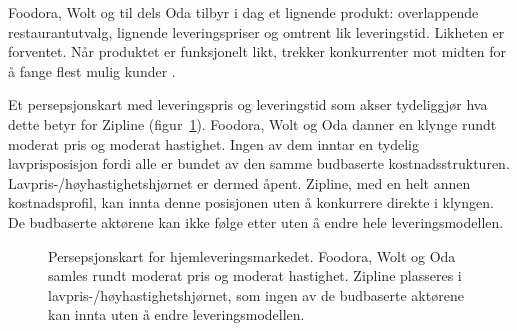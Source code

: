 \documentclass[12pt, a4paper]{article}
\begin{document}
Foodora, Wolt og til dels Oda tilbyr i dag et lignende produkt:
overlappende restaurantutvalg, lignende leveringspriser og omtrent lik
leveringstid. Likheten er forventet. Når produktet er funksjonelt likt,
trekker konkurrenter mot midten for å fange flest mulig kunder
\parencite{hotelling1929, veisdal2020}.

Et persepsjonskart med leveringspris og leveringstid som akser
tydeliggjør hva dette betyr for Zipline (figur~\ref{fig:posisjonskart}).
Foodora, Wolt og Oda danner en klynge rundt moderat pris og moderat
hastighet. Ingen av dem inntar en tydelig lavprisposisjon fordi alle er
bundet av den samme budbaserte kostnadsstrukturen.
Lavpris-/høyhastighetshjørnet er dermed åpent. Zipline, med en helt
annen kostnadsprofil, kan innta denne posisjonen uten å konkurrere
direkte i klyngen. De budbaserte aktørene kan ikke følge etter uten å
endre hele leveringsmodellen.

\begin{figure}[htbp]
  \centering
  \caption[Persepsjonskart for hjemleveringsmarkedet]{Persepsjonskart for
  hjemleveringsmarkedet. Foodora, Wolt og Oda samles rundt moderat pris og
  moderat hastighet. Zipline plasseres i lavpris-/høyhastighetshjørnet, som
  ingen av de budbaserte aktørene kan innta uten å endre leveringsmodellen.}
  \label{fig:posisjonskart}
\end{figure}
\end{document}
